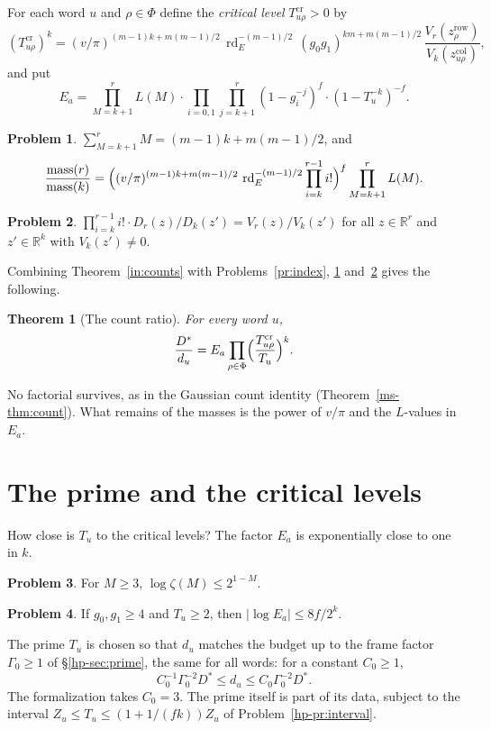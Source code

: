 \documentclass[reqno]{amsart}
\theoremstyle{definition}
\newtheorem{problem}{Problem}[section]
\theoremstyle{plain}
\newtheorem{theorem}{Theorem}[section]
\theoremstyle{remark}
\newcommand{\mass}{\operatorname{mass}}
\newcommand{\rd}{\operatorname{rd}}
\newcommand{\Tc}{T^{\mathrm{cr}}}
\newcommand{\zr}{z^{\mathrm{row}}}
\newcommand{\zc}{z^{\mathrm{col}}}
\begin{document}
For each word $u$ and $\rho\in\Phi$ define the \emph{critical level}
$\Tc_{u\rho}>0$ by
\[
 (\Tc_{u\rho})^k=(v/\pi)^{(m-1)k+m(m-1)/2}\,\rd_E^{-(m-1)/2}\,
 (g_0g_1)^{km+m(m-1)/2}\,\frac{V_r(\zr_\rho)}{V_k(\zc_{u\rho})},
\]
and put
\[
 E_a=\prod_{M=k+1}^{r}L(M)\cdot
 \prod_{i=0,1}\prod_{j=k+1}^{r}(1-g_i^{-j})^f\cdot(1-T_u^{-k})^{-f}.
\]

\begin{problem}\label{pr:telescope}
$\sum_{M=k+1}^{r}M=(m-1)k+m(m-1)/2$, and
\[
 \frac{\mass(r)}{\mass(k)}=\Bigl((v/\pi)^{(m-1)k+m(m-1)/2}\,
 \rd_E^{-(m-1)/2}\prod_{i=k}^{r-1}i!\Bigr)^f\prod_{M=k+1}^{r}L(M).
\]
\end{problem}

\begin{problem}\label{pr:factorials}
$\prod_{i=k}^{r-1}i!\cdot D_r(z)/D_k(z')=V_r(z)/V_k(z')$ for all
$z\in\mathbb R^r$ and $z'\in\mathbb R^k$ with $V_k(z')\ne0$.
\end{problem}

Combining Theorem~\ref{in:counts} with Problems~\ref{pr:index},
\ref{pr:telescope} and~\ref{pr:factorials} gives the following.

\begin{theorem}[The count ratio]\label{thm:count}
For every word $u$,
\[
 \frac{D^*}{d_u}=E_a\prod_{\rho\in\Phi}\Bigl(\frac{\Tc_{u\rho}}{T_u}\Bigr)^k .
\]
\end{theorem}

No factorial survives, as in the Gaussian count identity
(Theorem~\ref{ms-thm:count}).  What remains of the masses is the power of
$v/\pi$ and the $L$-values in $E_a$.

\section{The prime and the critical levels}\label{sec:prime}

How close is $T_u$ to the critical levels?  The factor $E_a$ is
exponentially close to one in $k$.

\begin{problem}\label{pr:zeta-tail}
For $M\ge3$, $\log\zeta(M)\le2^{1-M}$.
\end{problem}

\begin{problem}\label{pr:Ea}
If $g_0,g_1\ge4$ and $T_u\ge2$, then $|\log E_a|\le8f/2^k$.
\end{problem}

The prime $T_u$ is chosen so that $d_u$ matches the budget up to the
frame factor $\Gamma_0\ge1$ of \S\ref{hp-sec:prime}, the same for all
words: for a constant $C_0\ge1$,
\begin{equation}\label{eq:window}
 C_0^{-1}\Gamma_0^{-2}D^*\le d_u\le C_0\Gamma_0^{-2}D^*.
\end{equation}
The formalization takes $C_0=3$.  The prime itself is part of its data,
subject to the interval $Z_u\le T_u\le(1+1/(fk))Z_u$ of
Problem~\ref{hp-pr:interval}.
\end{document}
